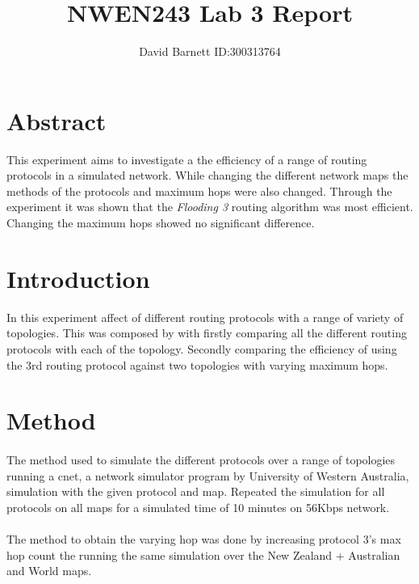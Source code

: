 \documentclass[11pt]{article}
\title{\textbf{NWEN243 Lab 3 Report}}
\author{David Barnett ID:300313764}
\begin{document}
\maketitle

\section{Abstract}\label{abstract}

This experiment aims to investigate a the efficiency of a range of
routing protocols in a simulated network. While changing the different network
maps the methods of the protocols and maximum hops were also changed. Through
the experiment it was shown that the \emph{Flooding 3} routing algorithm was
most efficient. Changing the maximum hops showed no significant difference.

\section{Introduction}\label{introduction}

In this experiment affect of different routing protocols with a range of
variety of topologies. This was composed by with firstly comparing all
the different routing protocols with each of the topology. Secondly
comparing the efficiency of using the 3rd routing protocol
against two topologies with varying maximum hops.

\section{Method}\label{method}

\paragraph{}
The method used to simulate the different protocols over a range of topologies
running a cnet, a network simulator program by University of Western
Australia, simulation with the given protocol and map. Repeated the simulation
for all protocols on all maps for a simulated time of 10 minutes on 56Kbps
network.

\paragraph{}
The method to obtain the varying hop was done by increasing protocol 3's
max hop count the running the same simulation over the New Zealand +
Australian and World maps.
\end{document}
